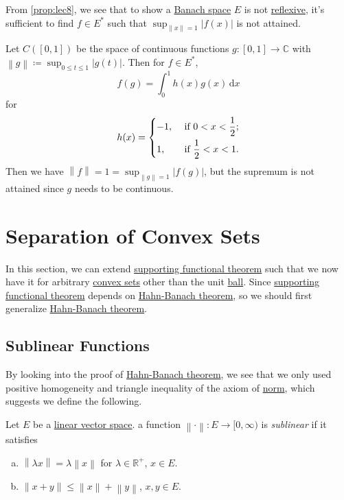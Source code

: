 From \autoref{prop:lec8}, we see that to show a \hyperref[def:Banach-space]{Banach space} \(E\) is not \hyperref[def:reflexive-space]{reflexive}, it's sufficient to find \(f\in E^{\ast} \) such that \(\sup _{\left\lVert x\right\rVert = 1}\left\vert f(x) \right\vert \) is not attained.

\begin{eg}
	Let \(C([0, 1])\) be the space of continuous functions \(g\colon [0, 1]\to \mathbb{C}\) with \(\left\lVert g\right\rVert \coloneqq \sup _{0 \leq t\leq 1} \left\vert g(t) \right\vert \). Then for \(f\in E^{\ast} \),
	\[
		f(g) = \int _0 ^1 h(x)g(x)\,\mathrm{d} x
	\]
	for
	\[
		h(x) = \begin{dcases}
			-1, & \text{ if } 0 < x < \frac{1}{2}; \\
			1,  & \text{ if } \frac{1}{2} < x < 1.
		\end{dcases}
	\]
	Then we have \(\left\lVert f\right\rVert = 1 = \sup _{\left\lVert g\right\rVert = 1}\left\vert f(g) \right\vert \), but the supremum is not attained since \(g\) needs to be continuous.
\end{eg}

\section{Separation of Convex Sets}
In this section, we can extend \hyperref[thm:supporting-functional]{supporting functional theorem} such that we now have it for arbitrary \hyperref[def:convex-set]{convex sets} other than the unit \hyperref[def:ball]{ball}. Since \hyperref[thm:supporting-functional]{supporting functional theorem} depends on \hyperref[thm:Hahn-Banach]{Hahn-Banach theorem}, so we should first generalize \hyperref[thm:Hahn-Banach]{Hahn-Banach theorem}.
\subsection{Sublinear Functions}
By looking into the proof of \hyperref[thm:Hahn-Banach]{Hahn-Banach theorem}, we see that we only used positive homogeneity and triangle inequality of the axiom of \hyperref[def:norm]{norm}, which suggests we define the following.

\begin{definition}[Sublinear]\label{def:sublinear}
	Let \(E\) be a \hyperref[def:linear-vector-space]{linear vector space}. a function \(\left\lVert \cdot\right\rVert \colon E \to [0, \infty )\) is \emph{sublinear} if it satisfies
	\begin{enumerate}[(a)]
		\item \(\left\lVert \lambda x\right\rVert = \lambda \left\lVert x\right\rVert \) for \(\lambda \in \mathbb{R}^+ \), \(x\in E\).
		\item \(\left\lVert x + y\right\rVert \leq \left\lVert x\right\rVert + \left\lVert y\right\rVert\), \(x, y\in E\).
	\end{enumerate}
\end{definition}

